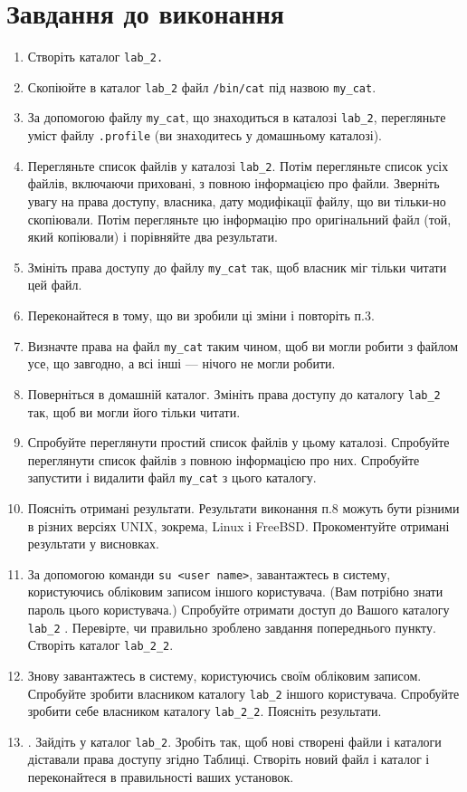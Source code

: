 \documentclass{article}
\begin{document}
 	
	
	\newpage
	\Large
	\section*{Завдання до виконання}
	\large
	\begin{enumerate}
	\item Створіть каталог \verb|lab_2.|
	\item Скопіюйте в каталог \verb|lab_2| файл \verb|/bin/cat| під назвою \verb|my_cat|.
	\item За допомогою файлу \verb|my_cat|, що знаходиться в каталозі \verb|lab_2|,
	перегляньте уміст файлу \verb|.profile| (ви знаходитесь у домашньому
	каталозі).
	\item Перегляньте список файлів у каталозі \verb|lab_2|. Потім перегляньте
	список усіх файлів, включаючи приховані, з повною інформацією про
	файли. Зверніть увагу на права доступу, власника, дату модифікації
	файлу, що ви тільки-но скопіювали. Потім перегляньте цю інформацію
	про оригінальний файл (той, який копіювали) і порівняйте два
	результати.
	\item Змініть права доступу до файлу \verb|my_cat| так, щоб власник міг тільки
	читати цей файл.
	\item Переконайтеся в тому, що ви зробили ці зміни і повторіть п.3.
	\item Визначте права на файл \verb|my_cat| таким чином, щоб ви могли робити з
	файлом усе, що завгодно, а всі інші — нічого не могли робити.
	\item Поверніться в домашній каталог. Змініть права доступу до каталогу
	\verb|lab_2| так, щоб ви могли його тільки читати.
	\item Спробуйте переглянути простий список файлів у цьому каталозі.
	Спробуйте переглянути список файлів з повною інформацією про них.
	Спробуйте запустити і видалити файл \verb|my_cat| з цього каталогу.
	\item Поясніть отримані результати. Результати виконання п.8 можуть бути
	різними в різних версіях UNIX, зокрема, Linux і FreeBSD.
	Прокоментуйте отримані результати у висновках.
	\item За допомогою команди \verb|su <user name>|, завантажтесь в систему,
	користуючись обліковим записом іншого користувача. (Вам потрібно
	знати пароль цього користувача.) Спробуйте отримати доступ до
	Вашого каталогу \verb|lab_2| . Перевірте, чи правильно зроблено завдання
	попереднього пункту. Створіть каталог \verb|lab_2_2|.
	\item Знову завантажтесь в систему, користуючись своїм обліковим
	записом. Спробуйте зробити власником каталогу \verb|lab_2| іншого
	користувача. Спробуйте зробити себе власником каталогу \verb|lab_2_2|.
	Поясніть результати.	
	\item . Зайдіть у каталог \verb|lab_2|. Зробіть так, щоб нові створені файли і
	каталоги діставали права доступу згідно Таблиці. Створіть новий файл
	і каталог і переконайтеся в правильності ваших установок.
	

\end{enumerate}
\end{document}
